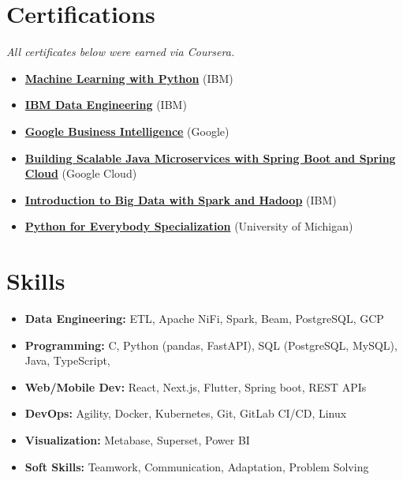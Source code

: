\documentclass[12pt,a4paper,sans]{moderncv}
\begin{document}
    \section{Certifications}
    \textit{All certificates below were earned via Coursera.}
    \begin{itemize}[leftmargin=0.7cm, itemsep=2pt, topsep=2pt]
        \item \textbf{\href{https://www.coursera.org/account/accomplishments/verify/G178XXP17WQA}{Machine Learning with Python}} (IBM)
        \item \textbf{\href{https://www.coursera.org/account/accomplishments/records/M5RKGX36BAVA}{IBM Data Engineering}} (IBM)
        \item \textbf{\href{https://www.coursera.org/account/accomplishments/verify/2QK7QK7QK7QK}{Google Business Intelligence}} (Google)
        \item \textbf{\href{https://google.com}{Building Scalable Java Microservices with Spring Boot and Spring Cloud}} (Google Cloud)
        \item \textbf{\href{https://www.coursera.org/account/accomplishments/verify/EK5SJM3YM7PX}{Introduction to Big Data with Spark and Hadoop}} (IBM)
        \item \textbf{\href{https://www.coursera.org/account/accomplishments/specialization/B4RCUAYCUG49}{Python for Everybody Specialization}} (University of Michigan)
    \end{itemize}



    \section{Skills}
    \begin{itemize}[leftmargin=0.5cm, itemsep=0pt, topsep=0pt]
    \item \textbf{Data Engineering:} ETL, Apache NiFi, Spark, Beam, PostgreSQL, GCP
    \item \textbf{Programming:} C, Python (pandas, FastAPI), SQL (PostgreSQL, MySQL), Java, TypeScript, 
    \item \textbf{Web/Mobile Dev:} React, Next.js, Flutter, Spring boot, REST APIs
    \item \textbf{DevOps:} Agility, Docker, Kubernetes, Git, GitLab CI/CD, Linux
    \item \textbf{Visualization:} Metabase, Superset, Power BI
    \item \textbf{Soft Skills:} Teamwork, Communication, Adaptation, Problem Solving
    \end{itemize}
\end{document}
